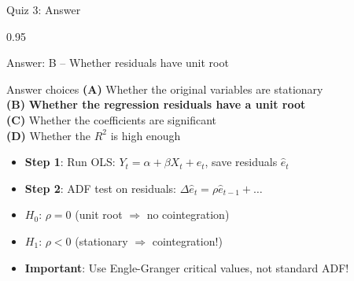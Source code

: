 \documentclass[9pt, aspectratio=169, t]{beamer}
\begin{document}
\begin{frame}{Quiz 3: Answer}
    \begin{cminipage}{0.95\textwidth}
    {\small
    \begin{exampleblock}{Answer: B -- Whether residuals have unit root}

    \begin{block}{Answer choices}
        \textcolor{MainBlue}{\textbf{(A)}} Whether the original variables are stationary \incorrect\\[3pt]
        \textcolor{MainBlue}{\textbf{(B)}} \textbf{\textcolor{Forest}{Whether the regression residuals have a unit root}} \correct\\[3pt]
        \textcolor{MainBlue}{\textbf{(C)}} Whether the coefficients are significant \incorrect\\[3pt]
        \textcolor{MainBlue}{\textbf{(D)}} Whether the $R^2$ is high enough \incorrect
    \end{block}

        \vspace{0.2cm}

        \begin{itemize}
            \item \textbf{Step 1}: Run OLS: $Y_t = \alpha + \beta X_t + e_t$, save residuals $\hat{e}_t$
            \item \textbf{Step 2}: ADF test on residuals: $\Delta \hat{e}_t = \rho \hat{e}_{t-1} + \ldots$
            \item $H_0$: $\rho = 0$ (unit root $\Rightarrow$ no cointegration)
            \item $H_1$: $\rho < 0$ (stationary $\Rightarrow$ cointegration!)
            \item \textbf{Important}: Use Engle-Granger critical values, not standard ADF!
        \end{itemize}
    \end{exampleblock}
    }
    \end{cminipage}
\end{frame}
\end{document}

